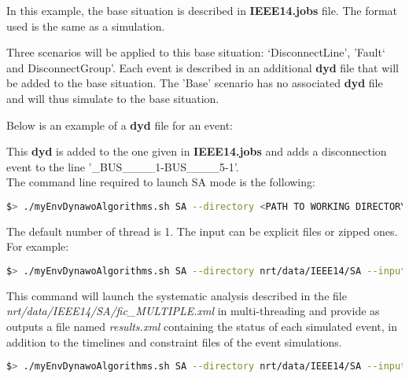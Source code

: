\documentclass[a4paper, 12pt]{report}
\begin{document}


In this example, the base situation is described in \textbf{IEEE14.jobs} file. The format used is the same as a \Dynawo simulation.

Three scenarios will be applied to this base situation: `DisconnectLine', 'Fault` and DisconnectGroup'. 
Each event is described in an additional \textbf{dyd} file that will be added to the base situation. 
The 'Base' scenario has no associated \textbf{dyd} file and will thus simulate to the base situation.

Below is an example of a \textbf{dyd} file for an event:



This \textbf{dyd} is added to the one given in \textbf{IEEE14.jobs} and adds a disconnection event to the line '\_BUS\_\_\_\_1-BUS\_\_\_\_5-1'.\\

The command line required to launch SA mode is the following:

\begin{lstlisting}[language=bash, breaklines=true, breakatwhitespace=false]
$> ./myEnvDynawoAlgorithms.sh SA --directory <PATH TO WORKING DIRECTORY> --input <NAME OF INPUT FILE> --output <NAME OF OUTPUT FILE> --nbThreads <NUMBER OF THREADS>
\end{lstlisting}

The default number of thread is 1. The input can be explicit files or zipped ones. For example:

\begin{lstlisting}[language=bash, breaklines=true, breakatwhitespace=false]
$> ./myEnvDynawoAlgorithms.sh SA --directory nrt/data/IEEE14/SA --input fic_MULTIPLE.xml --output results.xml --nbThreads 2
\end{lstlisting}

This command will launch the systematic analysis described in the file \textit{nrt/data/IEEE14/SA/fic\_MULTIPLE.xml} in multi-threading 
and provide as outputs a file named \textit{results.xml} containing the status of each simulated event, 
in addition to the timelines and constraint files of the \Dynawo event simulations.\\

\begin{lstlisting}[language=bash, breaklines=true, breakatwhitespace=false]
$> ./myEnvDynawoAlgorithms.sh SA --directory nrt/data/IEEE14/SA --input inputs.zip --output outputs.zip
\end{lstlisting}
\end{document}

